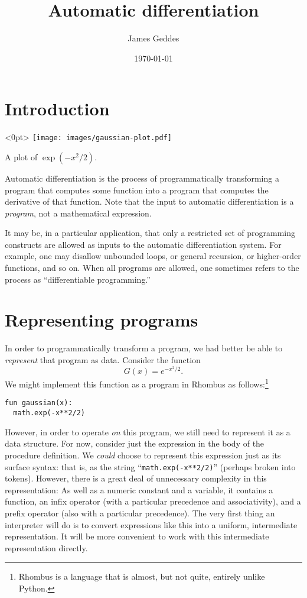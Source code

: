 \documentclass[11pt, a4paper]{article}
\title{Automatic differentiation}
\author{James Geddes}
\date{\today}
\newcommand{\cd}[1]{\texttt{#1}}
\begin{document}
\maketitle

\section{Introduction}


\begin{marginfigure}<0pt>
  \centering
  \texttt{[image: images/gaussian-plot.pdf]}
  \caption{A plot of $\exp(-x^2/2)$.\label{fig:gaussian-plot}}
\end{marginfigure}
Automatic differentiation is the process of programmatically
transforming a program that computes some function into a program that
computes the derivative of that function. Note that the input to
automatic differentiation is a \emph{program}, not a mathematical
expression.

It may be, in a particular application, that only a restricted set of
programming constructs are allowed as inputs to the automatic
differentiation system. For example, one may disallow unbounded loops,
or general recursion, or higher-order functions, and so on. When all
programs are allowed, one sometimes refers to the process as
``differentiable programming.''

\section{Representing programs}

In order to programmatically transform a program, we had better be
able to \emph{represent} that program as data. Consider the function
\begin{equation}
  \label{eq:gaussian-example}
  G(x) = e^{-x^2/2}.
\end{equation}
We might implement this function as a program in Rhombus
as follows:\footnote{Rhombus is a language that is almost, but not quite,
  entirely unlike Python.}
\begin{verbatim}
fun gaussian(x):
  math.exp(-x**2/2)
\end{verbatim}
However, in order to operate \emph{on} this program, we still need to
represent it as a data structure. For now, consider just the
expression in the body of the procedure definition. We \emph{could}
choose to represent this expression just as its surface syntax: that
is, as the string ``\cd{math.exp(-x**2/2)}'' (perhaps broken into
tokens). However, there is a great deal of unnecessary complexity in
this representation: As well as a numeric constant and a variable, it
contains a function, an infix operator (with a particular precedence
and associativity), and a prefix operator (also with a particular
precedence). The very first thing an interpreter will do is to convert
expressions like this into a uniform, intermediate representation. It
will be more convenient to work with this intermediate representation
directly.
\end{document}
